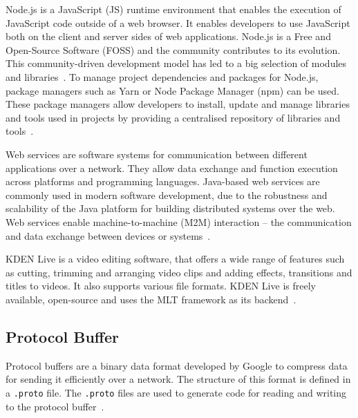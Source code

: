 \documentclass[../MasterThesis.tex]{subfiles}
\begin{document}
Node.js is a JavaScript (JS) runtime environment that enables the execution of JavaScript code outside of a web browser.
It enables developers to use JavaScript both on the client and server sides of web applications. 
Node.js is a Free and Open-Source Software (FOSS) and the community contributes to its evolution. This community-driven development model has led to a big selection of modules and libraries~\cite{nodejs, RM_Frontend, ap3_docs}.
%
To manage project dependencies and packages for Node.js, package managers such as Yarn or Node Package Manager (npm) can be used. These package managers allow developers to install, update and manage libraries and tools used in projects by providing a centralised repository of libraries and tools~\cite{RM_Frontend, npmyarn}.



Web services are software systems for communication between different applications over a network. 
They allow data exchange and function execution across platforms and programming languages. 
Java-based web services are commonly used in modern software development, due to the robustness and scalability of the Java platform for building distributed systems over the web.
Web services enable machine-to-machine (M2M) interaction -- the communication and data exchange between devices or systems~\cite{webservice}.

KDEN Live is a video editing software, that offers a wide range of features such as cutting, trimming and arranging video clips and adding effects, transitions and titles to videos. It also supports various file formats. KDEN Live is freely available, open-source and uses the MLT framework as its backend~\cite{kdenlive}.











\subsection{Protocol Buffer}
\label{subsection:protocolbuffer}


Protocol buffers are a binary data format developed by Google to compress data for sending it efficiently over a network. The structure of this format is defined in a \texttt{.proto} file. The \texttt{.proto} files are used to generate code for reading and writing to the protocol buffer~\cite{protobuffer}.
\end{document}
